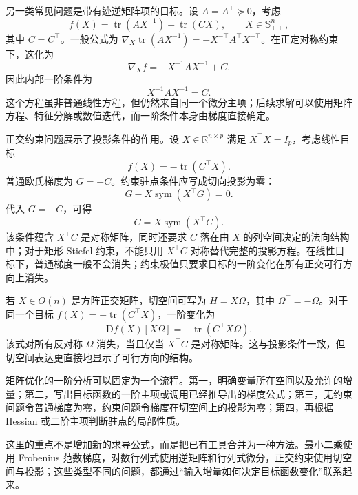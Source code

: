 另一类常见问题是带有迹逆矩阵项的目标。设 \(A=A^\top\succeq0\)，考虑
\[
f(X)=\operatorname{tr}(A X^{-1})+\operatorname{tr}(CX),\qquad X\in\mathbb{S}_{++}^n,
\]
其中 \(C=C^\top\)。一般公式为 \(\nabla_X\operatorname{tr}(A X^{-1})=-X^{-\top}A^\top X^{-\top}\)。在正定对称约束下，这化为
\[
\nabla_X f=-X^{-1}AX^{-1}+C.
\]
因此内部一阶条件为
\[
X^{-1}AX^{-1}=C.
\]
这个方程虽非普通线性方程，但仍然来自同一个微分主项；后续求解可以使用矩阵方程、特征分解或数值迭代，而一阶条件本身由梯度直接确定。

正交约束问题展示了投影条件的作用。设 \(X\in\mathbb{R}^{n\times p}\) 满足 \(X^\top X=I_p\)，考虑线性目标
\[
f(X)=-\operatorname{tr}(C^\top X).
\]
普通欧氏梯度为 \(G=-C\)。约束驻点条件应写成切向投影为零：
\[
G-X\operatorname{sym}(X^\top G)=0.
\]
代入 \(G=-C\)，可得
\[
C=X\operatorname{sym}(X^\top C).
\]
该条件蕴含 \(X^\top C\) 是对称矩阵，同时还要求 \(C\) 落在由 \(X\) 的列空间决定的法向结构中；对于矩形 Stiefel 约束，不能只用 \(X^\top C\) 对称替代完整的投影方程。在线性目标下，普通梯度一般不会消失；约束极值只要求目标的一阶变化在所有正交可行方向上消失。

若 \(X\in O(n)\) 是方阵正交矩阵，切空间可写为 \(H=X\Omega\)，其中 \(\Omega^\top=-\Omega\)。对于同一个目标 \(f(X)=-\operatorname{tr}(C^\top X)\)，一阶变化为
\[
\mathrm{D}f(X)[X\Omega]=-\operatorname{tr}(C^\top X\Omega).
\]
该式对所有反对称 \(\Omega\) 消失，当且仅当 \(X^\top C\) 是对称矩阵。这与投影条件一致，但切空间表达更直接地显示了可行方向的结构。

矩阵优化的一阶分析可以固定为一个流程。第一，明确变量所在空间以及允许的增量；第二，写出目标函数的一阶主项或调用已经推导出的梯度公式；第三，无约束问题令普通梯度为零，约束问题令梯度在切空间上的投影为零；第四，再根据 Hessian 或二阶主项判断驻点的局部性质。

这里的重点不是增加新的求导公式，而是把已有工具合并为一种方法。最小二乘使用 Frobenius 范数梯度，对数行列式使用逆矩阵和行列式微分，正交约束使用切空间与投影；这些类型不同的问题，都通过“输入增量如何决定目标函数变化”联系起来。
